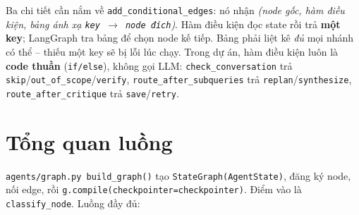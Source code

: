 \documentclass[12pt, a4paper]{report}
\begin{document}
Ba chi tiết cần nắm về \texttt{add\_conditional\_edges}: nó nhận \emph{(node gốc, hàm điều kiện, bảng ánh xạ \texttt{key $\rightarrow$ node đích})}. Hàm điều kiện đọc state rồi trả \textbf{một key}; LangGraph tra bảng để chọn node kế tiếp. Bảng phải liệt kê \emph{đủ} mọi nhánh có thể -- thiếu một key sẽ bị lỗi lúc chạy. Trong dự án, hàm điều kiện luôn là \textbf{code thuần} (\texttt{if/else}), không gọi LLM: \texttt{check\_conversation} trả \texttt{skip}/\texttt{out\_of\_scope}/\texttt{verify}, \texttt{route\_after\_subqueries} trả \texttt{replan}/\texttt{synthesize}, \texttt{route\_after\_critique} trả \texttt{save}/\texttt{retry}.

\section{Tổng quan luồng}

\texttt{agents/graph.py build\_graph()} tạo \texttt{StateGraph(AgentState)}, đăng ký node, nối edge, rồi \texttt{g.compile(checkpointer=checkpointer)}. Điểm vào là \texttt{classify\_node}. Luồng đầy đủ:
\end{document}
